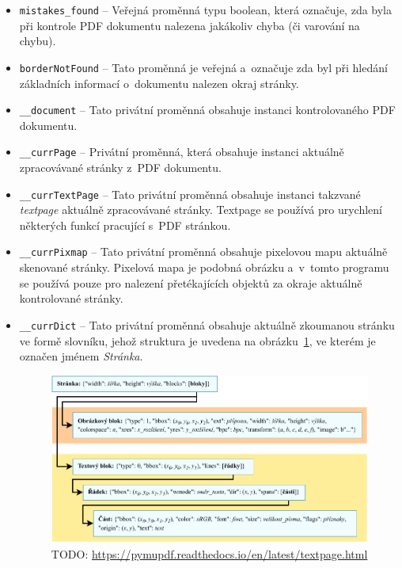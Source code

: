 \begin{itemize}
    \item \texttt{mistakes\_found} -- Veřejná proměnná typu boolean, která označuje,
    zda byla při kontrole PDF dokumentu nalezena jakákoliv chyba (či varování
    na chybu).

    \item \texttt{borderNotFound} -- Tato proměnná je veřejná a~označuje zda byl
    při hledání základních informací o~dokumentu nalezen okraj stránky. 

    \item \texttt{\_\_document} -- Tato privátní proměnná obsahuje instanci
    kontrolovaného PDF dokumentu.

    \item \texttt{\_\_currPage} -- Privátní proměnná, která obsahuje instanci
    aktuálně zpracovávané stránky z~PDF dokumentu.
    
    \item \texttt{\_\_currTextPage} -- Tato privátní proměnná obsahuje instanci
    takzvané \emph{textpage} aktuálně zpracovávané stránky. Textpage se používá
    pro urychlení některých funkcí pracující s~PDF stránkou.
    
    \item \texttt{\_\_currPixmap} -- Tato privátní proměnná obsahuje pixelovou
    mapu aktuálně skenované stránky. Pixelová mapa je podobná obrázku a~v~tomto
    programu se používá pouze pro nalezení přetékajících objektů za okraje
    aktuálně kontrolované stránky.
    
    \item \texttt{\_\_currDict} -- Tato privátní proměnná obsahuje aktuálně
    zkoumanou stránku ve formě slovníku, jehož struktura je uvedena na
    obrázku~\ref{pic_curr_page_dict}, ve kterém je označen jménem \emph{Stránka}.
    \begin{figure}[H]
        \centering
        \includegraphics[width=\linewidth]{obrazky-figures/page_dictionary.pdf}
        \caption{TODO: \url{https://pymupdf.readthedocs.io/en/latest/textpage.html}}
        \label{pic_curr_page_dict}
    \end{figure}
    

\end{itemize}
